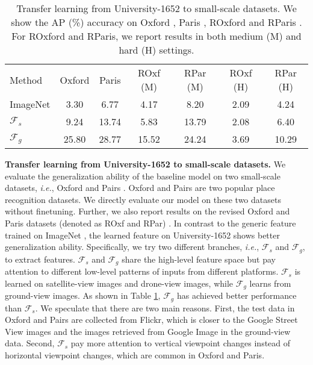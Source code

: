 \documentclass[sigconf]{acmart}
\def\ie{\emph{i.e.}}
\begin{document}
\setlength{\tabcolsep}{3pt}
\begin{table}
\small
\begin{center}
\begin{tabular}{l|c|c|c|c|c|c}
\hline
Method & Oxford	& Paris	& ROxf (M) & RPar (M) & ROxf (H) & RPar (H) \\
\shline
ImageNet & 3.30 & 6.77 & 4.17 & 8.20 & 2.09 & 4.24 \\
$\mathcal{F}_s$ & 9.24 & 13.74 & 5.83 & 13.79 & 2.08 & 6.40\\
$\mathcal{F}_g$ & 25.80 & 28.77 & 15.52 & 24.24 & 3.69 & 10.29\\
\hline
\end{tabular}
\end{center}
\caption{Transfer learning from University-1652 to small-scale datasets. We show the AP (\%) accuracy on Oxford \cite{philbin2007object}, Paris \cite{philbin2008lost}, ROxford and RParis \cite{RITAC18}. For ROxford and RParis, we report results in both medium (M) and hard (H) settings. }
\label{table:transfer}
\end{table}

\noindent\textbf{Transfer learning from University-1652 to small-scale datasets.} 
We evaluate the generalization ability of the baseline model on two small-scale datasets, \ie, Oxford \cite{philbin2007object} and Pairs \cite{philbin2008lost}. Oxford and Pairs are two popular place recognition datasets. We directly evaluate our model on these two datasets without finetuning. Further, we also report results on the revised Oxford and Paris datasets (denoted as ROxf and RPar) \cite{RITAC18}. In contrast to the generic feature trained on ImageNet \cite{deng2009imagenet}, the learned feature on University-1652 shows better generalization ability. Specifically, we try two different branches, \ie, $\mathcal{F}_s$ and $\mathcal{F}_g$, to extract features. $\mathcal{F}_s$ and $\mathcal{F}_g$ share the high-level feature space but pay attention to different low-level patterns of inputs from different platforms. $\mathcal{F}_s$ is learned on satellite-view images and drone-view images, while $\mathcal{F}_g$ learns from ground-view images. As shown in Table \ref{table:transfer}, $\mathcal{F}_g$ has achieved better performance than $\mathcal{F}_s$. We speculate that there are two main reasons. First, the test data in Oxford and Pairs are collected from Flickr, which is closer to the Google Street View images and the images retrieved from Google Image in the ground-view data. Second, $\mathcal{F}_s$ pay more attention to vertical viewpoint changes instead of horizontal viewpoint changes, which are common in Oxford and Paris.
\end{document}
